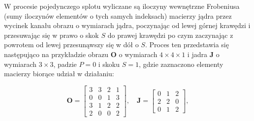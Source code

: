 \documentclass[pl,12pt]{aghdpl}
\begin{document}
W procesie pojedynczego splotu wyliczane są iloczyny wewnętrzne Frobeniusa
(sumy iloczynów elementów o tych samych indeksach) macierzy
jądra przez wycinek kanału obrazu o wymiarach jądra, poczynając od lewej górnej
krawędzi i przesuwając się w prawo o skok $S$ do prawej krawędzi po czym zaczynając
z powrotem od lewej przesunąwszy się w dół o $S$. Proces ten przedstawia się
następująco na przykładzie obrazu $\bm O$ o wymiarach $4 \times 4 \times 1$ i
jadra $\bm J$ o wymiarach $3 \times 3$, padzie $P = 0$ i skoku $S = 1$, gdzie
zaznaczono elementy macierzy biorące udział w działaniu:

\begin{equation}
  \bm O = \begin{bmatrix}
    3 & 3 & 2 & 1\\
    0 & 0 & 1 & 3\\
    3 & 1 & 2 & 2\\
    2 & 0 & 0 & 2
  \end{bmatrix},\quad
  \bm J = \begin{bmatrix}
    0 & 1 & 2\\
    2 & 2 & 0\\
    0 & 1 & 2
  \end{bmatrix},
\end{equation}
\tikzset{external/export=false}
\end{document}
